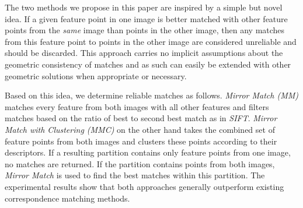 \documentclass[conference]{IEEEtran}
\begin{document}
The two methods we propose in this paper are inspired by a simple but 
novel idea. If a given feature point in one image is better matched with 
other feature points from the \emph{same} image than points in the other 
image, then any matches from this feature point to points in the other 
image are considered unreliable and should be discarded.  This approach 
carries no implicit assumptions about the geometric consistency of 
matches and as such can easily be extended with other geometric 
solutions when appropriate or necessary.

Based on this idea,  we determine reliable matches as follows. 
\emph{Mirror Match (MM)} matches every feature from both images with all 
other features and filters matches based on the ratio of best to second 
best match as in \emph{SIFT}. \emph{Mirror Match with Clustering (MMC)} 
on the other hand takes the combined set of feature points from both 
images and clusters these points according to their descriptors.  If a 
resulting partition contains only feature points from one image, no 
matches are returned.  If the partition contains points from both 
images, \emph{Mirror Match} is used to find the best matches within this 
partition.  The experimental results show that both approaches generally 
outperform existing correspondence matching methods.
\end{document}
